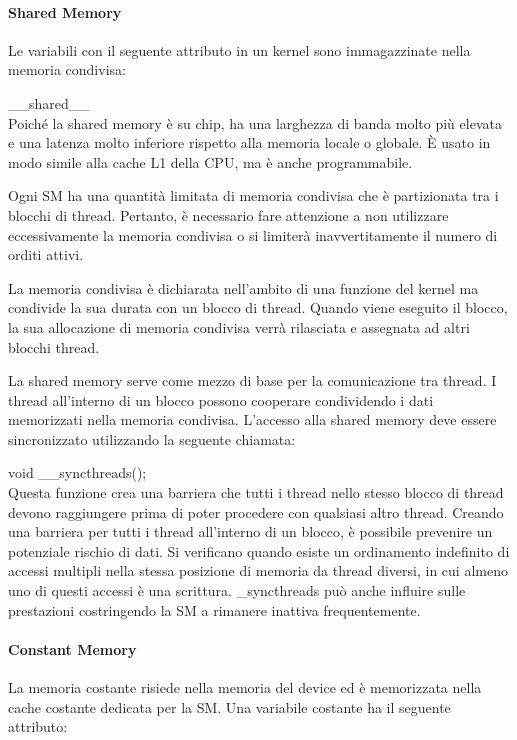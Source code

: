 \paragraph{Shared Memory}
Le variabili con il seguente attributo in un kernel sono immagazzinate nella memoria condivisa:

\_\_shared\_\_ \\

Poiché la shared memory è su chip, ha una larghezza di banda molto più elevata e una latenza molto inferiore rispetto alla memoria locale o globale. È usato in modo simile alla cache L1 della CPU, ma è anche programmabile.

Ogni SM ha una quantità limitata di memoria condivisa che è partizionata tra i blocchi di thread. Pertanto, è necessario fare attenzione a non utilizzare eccessivamente la memoria condivisa o si limiterà inavvertitamente il numero di orditi attivi.

La memoria condivisa è dichiarata nell'ambito di una funzione del kernel ma condivide la sua durata con un blocco di thread. Quando viene eseguito il blocco, la sua allocazione di memoria condivisa verrà rilasciata e assegnata ad altri blocchi thread.

La shared memory serve come mezzo di base per la comunicazione tra thread. I thread all'interno di un blocco possono cooperare condividendo i dati memorizzati nella memoria condivisa. L'accesso alla shared memory deve essere sincronizzato utilizzando la seguente chiamata:

void \_\_syncthreads();\\

Questa funzione crea una barriera che tutti i thread nello stesso blocco di thread devono raggiungere prima di poter procedere con qualsiasi altro thread. Creando una barriera per tutti i thread all'interno di un blocco, è possibile prevenire un potenziale rischio di dati. Si verificano quando esiste un ordinamento indefinito di accessi multipli nella stessa posizione di memoria da thread diversi, in cui almeno uno di questi accessi è una scrittura. \_syncthreads può anche influire sulle prestazioni costringendo la SM a rimanere inattiva frequentemente.

\paragraph{Constant Memory}
La memoria costante risiede nella memoria del device ed è memorizzata nella cache costante dedicata per la SM. Una variabile costante ha il seguente attributo:

